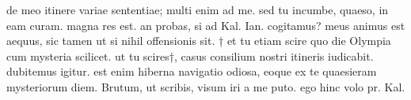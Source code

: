 


 de meo itinere variae sententiae; multi enim ad me. sed tu incumbe, quaeso, in eam curam. magna res est. an probas, si ad Kal. Ian. cogitamus? meus animus est aequus, sic tamen ut si nihil offensionis sit. † et tu etiam scire quo die Olympia cum mysteria scilicet. ut tu scires†, casus consilium nostri itineris iudicabit. dubitemus igitur. est enim hiberna navigatio odiosa, eoque ex te quaesieram mysteriorum diem. Brutum, ut scribis, visum iri a me puto. ego hinc volo pr. Kal.
